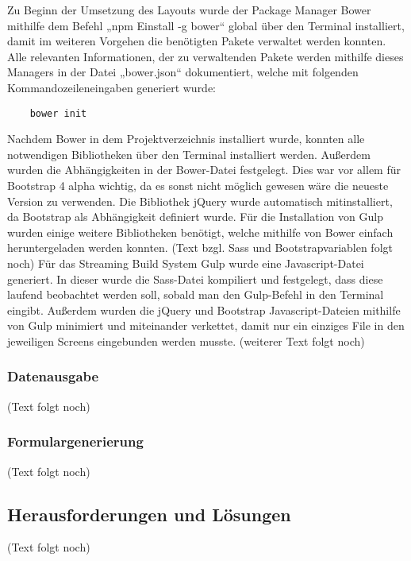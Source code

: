 	Zu Beginn der Umsetzung des Layouts wurde der Package Manager Bower mithilfe dem Befehl „npm Einstall -g bower“ global über den Terminal installiert, damit im weiteren Vorgehen die benötigten Pakete verwaltet werden konnten. Alle relevanten Informationen, der zu verwaltenden Pakete werden mithilfe dieses Managers in der Datei „bower.json“ dokumentiert, welche mit folgenden Kommandozeileneingaben generiert wurde:
	\lstset{language = bash}
  	\begin{lstlisting}
  	bower init
  	\end{lstlisting}
	Nachdem Bower in dem Projektverzeichnis installiert wurde, konnten alle notwendigen Bibliotheken über den Terminal installiert werden. Außerdem wurden die Abhängigkeiten in der Bower-Datei festgelegt. Dies war vor allem für Bootstrap 4 alpha wichtig, da es sonst nicht möglich gewesen wäre die neueste Version zu verwenden. Die Bibliothek jQuery wurde automatisch mitinstalliert, da Bootstrap als Abhängigkeit definiert wurde. Für die Installation von Gulp wurden einige weitere Bibliotheken benötigt, welche mithilfe von Bower einfach heruntergeladen werden konnten.
	(Text bzgl. Sass und Bootstrapvariablen folgt noch)
	Für das Streaming Build System Gulp wurde eine Javascript-Datei generiert. In dieser wurde die Sass-Datei kompiliert und festgelegt, dass diese laufend beobachtet werden soll, sobald man den Gulp-Befehl in den Terminal eingibt. Außerdem wurden die jQuery und Bootstrap Javascript-Dateien mithilfe von Gulp minimiert und miteinander verkettet, damit nur ein einziges File in den jeweiligen Screens eingebunden werden musste.
	(weiterer Text folgt noch)

    \subsubsection{Datenausgabe}

	(Text folgt noch)

    \subsubsection{Formulargenerierung}

	(Text folgt noch)

  \subsection{Herausforderungen und Lösungen}

	(Text folgt noch)
